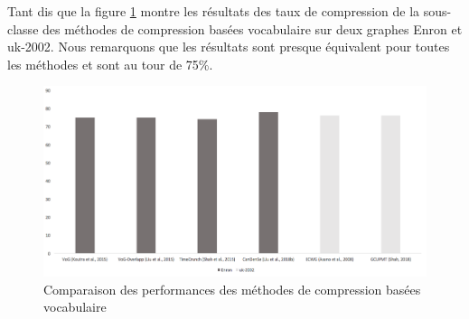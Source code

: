 		Tant dis que la figure \ref{comparaisonVoc} 	montre les résultats des taux de compression de la sous-classe des méthodes de compression basées vocabulaire sur deux graphes Enron et uk-2002. Nous remarquons que les résultats sont presque équivalent pour toutes les méthodes et sont au tour de 75\%.
				
				\begin{figure}[H]
				
				\includegraphics[scale=0.39]{ressources/image/vocabulary.png} 
					\centering
					\caption{Comparaison des performances des méthodes de compression basées vocabulaire}
					\label{comparaisonVoc}
				\end{figure}
			
			

